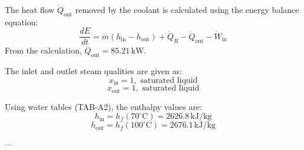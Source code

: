 The heat flow \( \dot{Q}_{\text{out}} \) removed by the coolant is calculated using the energy balance equation:  
\[
\frac{dE}{dt} = \dot{m} (h_{\text{in}} - h_{\text{out}}) + \dot{Q}_R - \dot{Q}_{\text{out}} - \dot{W}_{\text{in}}
\]  
From the calculation, \( \dot{Q}_{\text{out}} = 85.21 \, \text{kW} \).  

The inlet and outlet steam qualities are given as:  
\[
x_{\text{in}} = 1, \text{ saturated liquid}
\]  
\[
x_{\text{out}} = 1, \text{ saturated liquid}
\]  

Using water tables (TAB-A2), the enthalpy values are:  
\[
h_{\text{in}} = h_f(70^\circ\text{C}) = 2626.8 \, \text{kJ/kg}
\]  
\[
h_{\text{out}} = h_f(100^\circ\text{C}) = 2676.1 \, \text{kJ/kg}
\]  

---